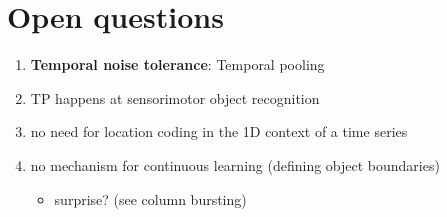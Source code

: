 \documentclass[a4paper,10pt]{article}
\begin{document}
\section{Open questions}
\begin{enumerate}
  \item \textbf{Temporal noise tolerance}: Temporal pooling
  \item TP happens at sensorimotor object recognition
  \item no need for location coding in the 1D context of a time series
  \item no mechanism for continuous learning (defining object boundaries)
      \begin{itemize}
        \item surprise? (see column bursting)
      \end{itemize}
\end{enumerate}
\end{document}
